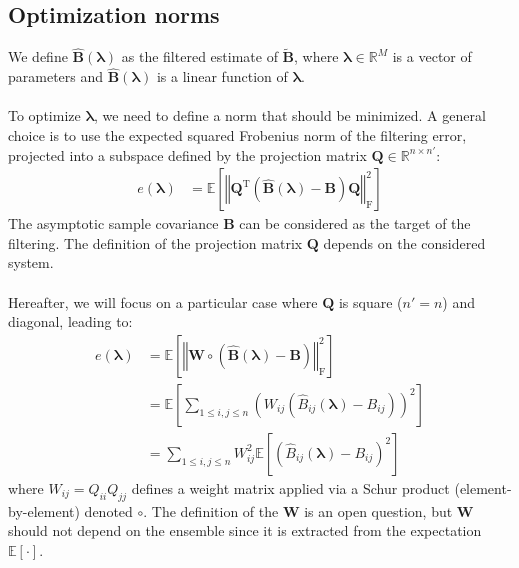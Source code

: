 \documentclass[12pt]{scrartcl}
\begin{document}
\subsection{Optimization norms}
We define $\widehat{\mathbf{B}}\left(\boldsymbol{\lambda}\right)$ as the filtered estimate of $\widetilde{\mathbf{B}}$, where $\boldsymbol{\lambda} \in \mathbb{R}^M$ is a vector of parameters and $\widehat{\mathbf{B}}\left(\boldsymbol{\lambda}\right)$ is a linear function of $\boldsymbol{\lambda}$.\\
$  $\\
To optimize $\boldsymbol{\lambda}$, we need to define a norm that should be minimized. A general choice is to use the expected squared Frobenius norm of the filtering error, projected into a subspace defined by the projection matrix $\mathbf{Q} \in \mathbb{R}^{n \times n'}$:
\begin{align}
\label{eq:norm_proj}
e\left(\boldsymbol{\lambda}\right) & = \mathbb{E}\left[ \left\Vert \mathbf{Q}^\mathrm{T} \left(\widehat{\mathbf{B}}\left(\boldsymbol{\lambda}\right) - \mathbf{B} \right) \mathbf{Q} \right\Vert_\mathrm{F}^2 \right]
\end{align}
The asymptotic sample covariance $\mathbf{B}$ can be considered as the target of the filtering. The definition of the projection matrix $\mathbf{Q}$ depends on the considered system.\\
$  $\\
Hereafter, we will focus on a particular case where $\mathbf{Q}$ is square ($n' = n$) and diagonal, leading to:
\begin{align}
\label{eq:norm_proj_2}
e\left(\boldsymbol{\lambda}\right) & = \mathbb{E}\left[ \left\Vert \mathbf{W} \circ \left(\widehat{\mathbf{B}}\left(\boldsymbol{\lambda}\right) - \mathbf{B} \right) \right\Vert_\mathrm{F}^2 \right] \nonumber \\
& = \mathbb{E}\left[ \sum_{1 \le i,j \le n} \left(W_{ij} \left(\widehat{B}_{ij}\left(\boldsymbol{\lambda}\right) - B_{ij} \right) \right)^2 \right] \nonumber \\
& = \sum_{1 \le i,j \le n} W^2_{ij} \mathbb{E}\left[\left(\widehat{B}_{ij}\left(\boldsymbol{\lambda}\right) - B_{ij} \right)^2\right]
\end{align}
where $W_{ij} = Q_{ii} Q_{jj}$ defines a weight matrix applied via a Schur product (element-by-element) denoted $\circ$. The definition of the $\mathbf{W}$ is an open question, but $\mathbf{W}$ should not depend on the ensemble since it is extracted from the expectation $\mathbb{E}\left[\cdot\right]$.
\end{document}
